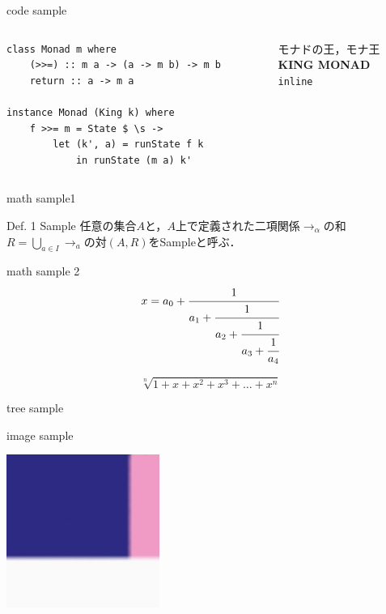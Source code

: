 \documentclass[aspectratio=1610,14pt]{beamer}
\begin{document}
\begin{frame}[fragile]{code sample}
    \begin{columns}
        \begin{column}{0.5\textwidth}
            \begin{lstlisting}
class Monad m where 
    (>>=) :: m a -> (a -> m b) -> m b 
    return :: a -> m a

instance Monad (King k) where
    f >>= m = State $ \s ->
        let (k', a) = runState f k
            in runState (m a) k'
            \end{lstlisting}
        \end{column}
        \begin{column}{0.5\textwidth}
            モナドの王，モナ王 \\
            \textbf{KING MONAD}\\
            \lstinline|inline|
        \end{column}
    \end{columns}
\end{frame}


\begin{frame}{math sample1}
    \begin{block}{Def. 1 Sample}
        任意の集合$A$と，$A$上で定義された二項関係$\to_{\alpha}$の和$R = \bigcup_{a \in I} \to_a $の対$(A, R)$をSampleと呼ぶ．
    \end{block}

\end{frame}

\begin{frame}{math sample 2}
  \begin{equation}
    x = a_0 + \cfrac{1}{a_1 
      + \cfrac{1}{a_2 
        + \cfrac{1}{a_3 + \cfrac{1}{a_4} } } }
  \end{equation}

  \[
  \sqrt[n]{1+x+x^2+x^3+\dots+x^n}
  \]
\end{frame}

\begin{frame}{tree sample}
\end{frame}

\begin{frame}{image sample}
    \begin{center}
        \includegraphics[width = 5cm]{./fig/kya}
    \end{center}
\end{frame}
\end{document}
